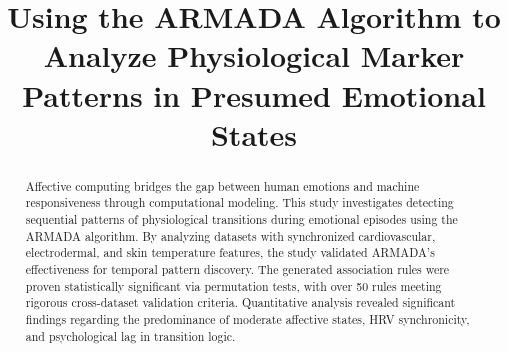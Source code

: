 \documentclass{isd}
\begin{document}
\title{Using the ARMADA Algorithm to Analyze Physiological Marker Patterns in Presumed Emotional States}





\maketitle
\vspace{-2.7cm}

\begin{abstract}
Affective computing bridges the gap between human emotions and machine responsiveness through computational modeling. This study investigates detecting sequential patterns of physiological transitions during emotional episodes using the ARMADA algorithm. By analyzing datasets with synchronized cardiovascular, electrodermal, and skin temperature features, the study validated ARMADA’s effectiveness for temporal pattern discovery. The generated association rules were proven statistically significant via permutation tests, with over 50 rules meeting rigorous cross-dataset validation criteria. Quantitative analysis revealed significant findings regarding the predominance of moderate affective states, HRV synchronicity, and psychological lag in transition logic.\par\vspace*{2mm}

\end{abstract}
\end{document}
